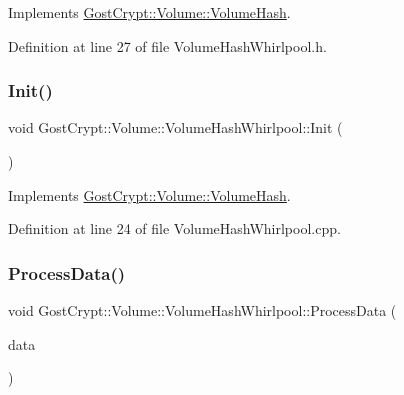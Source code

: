 Implements \hyperlink{class_gost_crypt_1_1_volume_1_1_volume_hash_a7f565609ef9bd178423575603b252d33}{Gost\+Crypt\+::\+Volume\+::\+Volume\+Hash}.



Definition at line 27 of file Volume\+Hash\+Whirlpool.\+h.

\mbox{\label{class_gost_crypt_1_1_volume_1_1_volume_hash_whirlpool_af787bf1be5ab88af610062c307b92738}} 
\subsubsection{\texorpdfstring{Init()}{Init()}}
{\footnotesize\ttfamily void Gost\+Crypt\+::\+Volume\+::\+Volume\+Hash\+Whirlpool\+::\+Init (\begin{DoxyParamCaption}{ }\end{DoxyParamCaption})\hspace{0.3cm}{\ttfamily [virtual]}}



Implements \hyperlink{class_gost_crypt_1_1_volume_1_1_volume_hash_a7167d7316a705369d8bc4e1cc5f2e61e}{Gost\+Crypt\+::\+Volume\+::\+Volume\+Hash}.



Definition at line 24 of file Volume\+Hash\+Whirlpool.\+cpp.

\mbox{\label{class_gost_crypt_1_1_volume_1_1_volume_hash_whirlpool_ae83645382a261787b78f43c4bfc1ed16}} 
\subsubsection{\texorpdfstring{Process\+Data()}{ProcessData()}}
{\footnotesize\ttfamily void Gost\+Crypt\+::\+Volume\+::\+Volume\+Hash\+Whirlpool\+::\+Process\+Data (\begin{DoxyParamCaption}\item[{const \hyperlink{class_gost_crypt_1_1_buffer_ptr}{Buffer\+Ptr} \&}]{data }\end{DoxyParamCaption})\hspace{0.3cm}{\ttfamily [virtual]}}



